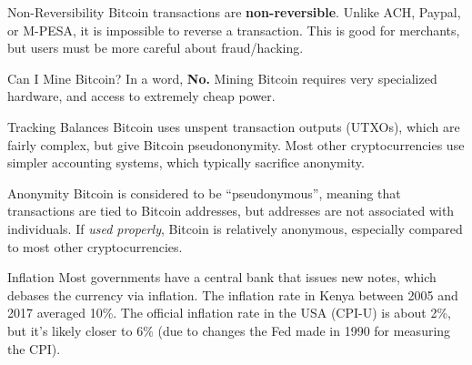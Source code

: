 \documentclass[14pt]{beamer}
\begin{document}
\begin{frame}{Non-Reversibility}
  Bitcoin transactions are \textbf{non-reversible}.
  \newline
  \newline
  Unlike ACH, Paypal, or M-PESA, it is impossible to reverse a transaction.
  \newline
  \newline
  This is good for merchants, but users must be more careful about
  fraud/hacking.
\end{frame}

\begin{frame}{Can I Mine Bitcoin?}
  In a word, \textbf{No.}
  \newline
  \newline
  Mining Bitcoin requires very specialized hardware, and access to extremely
  cheap power.
\end{frame}

\begin{frame}{Tracking Balances}
  Bitcoin uses unspent transaction outputs (UTXOs), which are fairly complex,
  but give Bitcoin pseudononymity.
  \newline
  \newline
  Most other cryptocurrencies use simpler accounting systems, which typically
  sacrifice anonymity.
\end{frame}

\begin{frame}{Anonymity}
  Bitcoin is considered to be ``pseudonymous'', meaning that transactions are
  tied to Bitcoin addresses, but addresses are not associated with individuals.
  \newline
  \newline
  If \emph{used properly}, Bitcoin is relatively anonymous, especially compared
  to most other cryptocurrencies.
\end{frame}

\begin{frame}{Inflation}
  Most governments have a central bank that issues new notes, which debases the
  currency via inflation.
  \newline
  \newline
  The inflation rate in Kenya between 2005 and 2017 averaged 10\%.
  \newline
  \newline
  The official inflation rate in the USA (CPI-U) is about 2\%, but it's likely
  closer to 6\% (due to changes the Fed made in 1990 for measuring the CPI).
\end{frame}
\end{document}
